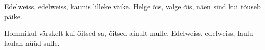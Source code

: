 Edelweiss, edelweiss,
kaunis lilleke v\"aike.
Helge \~ois, valge \~ois,
n\"aen sind kui t\~ouseb p\"aike.

Hommikul v\"arskelt kui \~oitsed sa,
\~oitsed ainult mulle.
Edelweiss, edelweiss,
laulu laulan n\"u\"ud sulle.